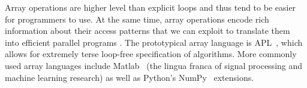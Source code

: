 \documentclass[preprint]{sigplanconf}
\begin{document}



Array operations are higher level than explicit loops and thus tend to be easier for programmers to use. At the same time, array operations encode rich information about their access patterns that we can exploit to translate them into efficient parallel programs \cite{Ju94}. The prototypical array language is APL~\cite{Iverson62}, which allows for extremely terse loop-free specification of algorithms. More commonly used array languages include Matlab~\cite{Moler80} (the lingua franca of signal processing and machine learning research) as well as Python's NumPy~\cite{Oliphant07} extensions.
\end{document}
